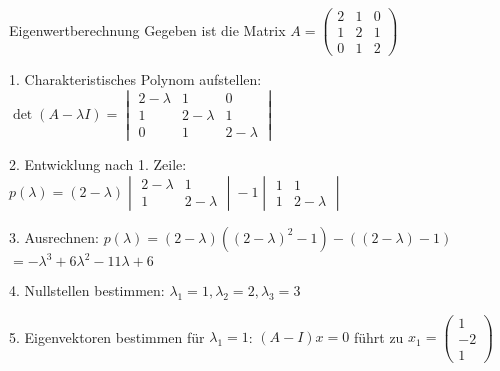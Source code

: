 \begin{example2}{Eigenwertberechnung}
Gegeben ist die Matrix
$A = \begin{pmatrix} 
2 & 1 & 0 \\
1 & 2 & 1 \\
0 & 1 & 2
\end{pmatrix}$

1. Charakteristisches Polynom aufstellen:
   $\det(A - \lambda I) = \begin{vmatrix} 
   2-\lambda & 1 & 0 \\
   1 & 2-\lambda & 1 \\
   0 & 1 & 2-\lambda
   \end{vmatrix}$

2. Entwicklung nach 1. Zeile:
   $p(\lambda) = (2-\lambda)\begin{vmatrix}
   2-\lambda & 1 \\
   1 & 2-\lambda
   \end{vmatrix} - 1\begin{vmatrix}
   1 & 1 \\
   1 & 2-\lambda
   \end{vmatrix}$
   
3. Ausrechnen:
   $p(\lambda) = (2-\lambda)((2-\lambda)^2 - 1) - ((2-\lambda) - 1)$
   $= -\lambda^3 + 6\lambda^2 - 11\lambda + 6$

4. Nullstellen bestimmen:
   $\lambda_1 = 1, \lambda_2 = 2, \lambda_3 = 3$

5. Eigenvektoren bestimmen für $\lambda_1 = 1$:
   $(A - I)x = 0$ führt zu $x_1 = \begin{pmatrix} 1 \\ -2 \\ 1 \end{pmatrix}$
\end{example2}

